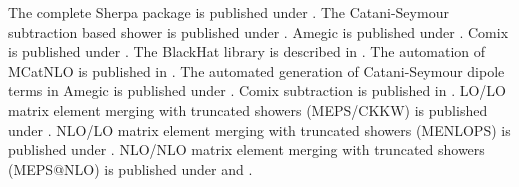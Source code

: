\documentclass{article}
\begin{document}
The complete Sherpa package is published under \cite{Gleisberg:2008ta}.
The Catani-Seymour subtraction based shower is published under \cite{Schumann:2007mg}.
Amegic is published under \cite{Krauss:2001iv}.
Comix is published under \cite{Gleisberg:2008fv}.
The BlackHat library is described in \cite{Berger:2008sj}.
The automation of MCatNLO is published in \cite{Hoeche:2011fd}.
The automated generation of Catani-Seymour dipole terms in Amegic is published under \cite{Gleisberg:2007md}.
Comix subtraction is published in \cite{Hoeche:2012xx}.
LO/LO matrix element merging with truncated showers (MEPS/CKKW) is published under \cite{Hoeche:2009rj}.
NLO/LO matrix element merging with truncated showers (MENLOPS) is published under \cite{Hoeche:2010kg}.
NLO/NLO matrix element merging with truncated showers (MEPS@NLO) is published under \cite{Hoeche:2012yf} and \cite{Gehrmann:2012yg}.
\end{document}
